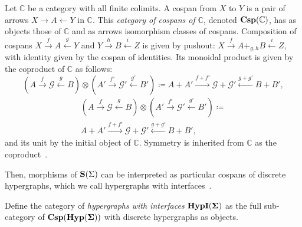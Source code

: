 \begin{definition}
Let $\mathbb{C}$ be a category with all finite colimits.  A cospan from $X$ to $Y$ is a pair of arrows $X \xrightarrow{} A \xleftarrow{} Y$  in $\mathbb{C}$.  This \textit{category of cospans of $\mathbb{C}$},  denoted $\mathbf{Csp(\mathbb{C})}$,  has as objects those of $\mathbb{C}$ and as arrows isomorphism classes of cospans.
Composition of cospans $X \xrightarrow{f} A \xleftarrow{g} Y$ and $Y \xrightarrow{h} B \xleftarrow{i} Z$ is given by pushout: $X \xrightarrow{f} A +_{g,h} B \xleftarrow{i} Z$,  with identity given by the cospan of identities.  Its monoidal product is given by the coproduct of $\mathbb{C}$ as follows: 
\ifdefined \ONECOLUMN
\[
    (A \xrightarrow{f} \mathcal{G} \xleftarrow{g} B) \otimes (A' \xrightarrow{f'} \mathcal{G'} \xleftarrow{g'} B') \coloneq A + A' \xrightarrow{f+f'} \mathcal{G} + \mathcal{G'} \xleftarrow{g+g'} B + B'  ,
\]
\else
\begin{multline*}
    (A \xrightarrow{f} \mathcal{G} \xleftarrow{g} B) \otimes (A' \xrightarrow{f'} \mathcal{G'} \xleftarrow{g'} B') \coloneq\\ A + A' \xrightarrow{f+f'} \mathcal{G} + \mathcal{G'} \xleftarrow{g+g'} B + B'  , 
\end{multline*}
\fi
and its unit by the initial object of $\mathbb{C}$.
Symmetry is inherited from $\mathbb{C}$ as the coproduct~\cite{MonoidalCoproduct}.
\end{definition}


Then, morphisms of $\mathbf{S}(\Sigma)$ can be interpreted as particular cospans of discrete hypergraphs,  which we call hypergraphs with interfaces~\cite{bonchi_string_2022-2}.
\begin{definition}
\label{def:cspd}
Define the category of \emph{hypergraphs with interfaces} $\mathbf{HypI(\Sigma)}$ as the full sub-category of $\mathbf{Csp(Hyp(\Sigma))}$ with discrete hypergraphs as objects.
\end{definition}

